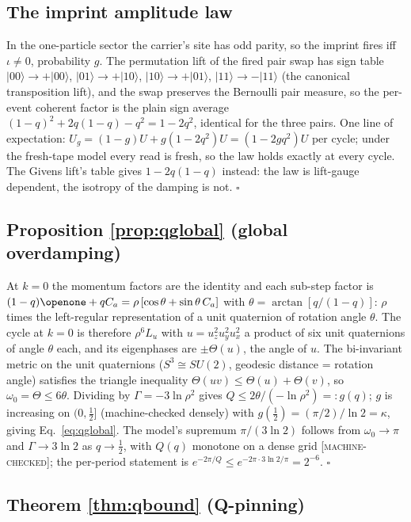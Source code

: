 \documentclass[aps,prd,twocolumn,superscriptaddress,nofootinbib,floatfix]{revtex4-2}
\newcommand{\evM}{\textnormal{\textsc{[machine-checked]}}}
\begin{document}
\subsection{The imprint amplitude law}

In the one-particle sector the carrier's site has odd parity, so the
imprint fires iff $\iota\neq0$, probability $g$. The permutation lift
of the fired pair swap has sign table $|00\rangle\to+|00\rangle$,
$|01\rangle\to+|10\rangle$, $|10\rangle\to+|01\rangle$,
$|11\rangle\to-|11\rangle$ (the canonical transposition lift), and the
swap preserves the Bernoulli pair measure, so the per-event coherent
factor is the plain sign average $(1-q)^2+2q(1-q)-q^2=1-2q^2$,
identical for the three pairs. One line of expectation:
$U_g=(1-g)U+g(1-2q^2)U=(1-2gq^2)U$ per cycle; under the fresh-tape
model every read is fresh, so the law holds exactly at every cycle. The
Givens
lift's table gives $1-2q(1-q)$ instead: the law is lift-gauge
dependent, the isotropy of the damping is not. \hfill$\square$

\subsection{Proposition \ref{prop:qglobal} (global overdamping)}

At $k=0$ the momentum factors are the identity and each sub-step
factor is $(1-q)\openone+qC_a=\rho\,[\cos\theta+\sin\theta\,C_a]$ with
$\theta=\arctan[q/(1-q)]$: $\rho$ times the left-regular representation
of a unit quaternion of rotation angle $\theta$. The cycle at $k=0$ is
therefore $\rho^6L_u$ with $u=u_z^2u_y^2u_x^2$ a product of six unit
quaternions of angle $\theta$ each, and its eigenphases are
$\pm\Theta(u)$, the angle of $u$. The bi-invariant metric on the unit
quaternions ($S^3\cong SU(2)$, geodesic distance = rotation angle)
satisfies the triangle inequality
$\Theta(uv)\le\Theta(u)+\Theta(v)$, so $\omega_0=\Theta\le6\theta$.
Dividing by $\Gamma=-3\ln\rho^2$ gives
$Q\le2\theta/(-\ln\rho^2)=:g(q)$; $g$ is increasing on
$(0,\tfrac12]$ (machine-checked densely) with
$g(\tfrac12)=(\pi/2)/\ln2=\kappa$, giving Eq.~\eqref{eq:qglobal}. The
model's supremum $\pi/(3\ln2)$ follows from
$\omega_0\to\pi$ and $\Gamma\to3\ln2$ as $q\to\tfrac12$, with $Q(q)$
monotone on a dense grid \evM{}; the per-period statement is
$e^{-2\pi/Q}\le e^{-2\pi\cdot3\ln2/\pi}=2^{-6}$. \hfill$\square$

\subsection{Theorem \ref{thm:qbound} (Q-pinning)}
\end{document}
